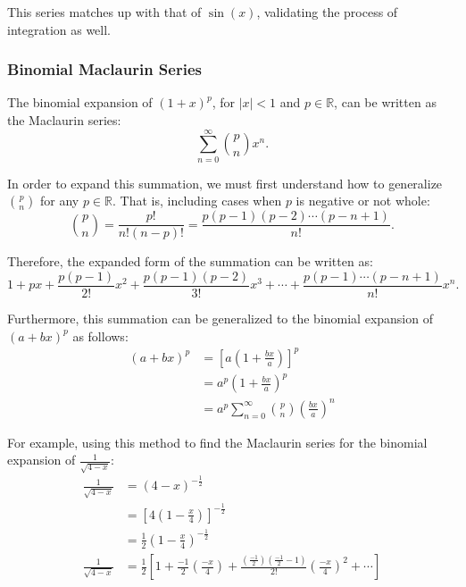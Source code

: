 \documentclass[12pt]{article}
\begin{document}
This series matches up with that of $\sin(x)$, validating the process of integration as well.

\subsubsection{Binomial Maclaurin Series}

\noindent The binomial expansion of $(1 + x)^p$, for $|x| < 1$ and $p \in \mathbb{R}$, can be written as the Maclaurin series:
\[ \sum_{n=0}^\infty \binom{p}{n} x^n. \]

In order to expand this summation, we must first understand how to generalize $\binom{p}{n}$ for any $p \in \mathbb{R}$. That is, including cases when $p$ is negative or not whole:
\[ \binom{p}{n} = \frac{p!}{n!(n-p)!} = \frac{p(p-1)(p-2) \cdots (p-n+1)}{n!}. \]

\noindent Therefore, the expanded form of the summation can be written as:
\[ 1 + px + \frac{p(p-1)}{2!} x^2 + \frac{p(p-1)(p-2)}{3!} x^3 + \cdots + \frac{p(p-1) \cdots (p-n+1)}{n!} x^n. \]

Furthermore, this summation can be generalized to the binomial expansion of ${(a + bx)^p}$ as follows:
\begin{align*}
	(a + bx)^p & = \left[ a \left( 1 + \frac{bx}{a} \right) \right]^p                 \\[6pt]
	& = a^p \left( 1 + \frac{bx}{a} \right)^p                              \\[6pt]
	& = a^p \sum_{n=0}^{\infty} \binom{p}{n} \left( \frac{bx}{a} \right)^n
\end{align*}

For example, using this method to find the Maclaurin series for the binomial expansion of $\frac{1}{\sqrt{4 - x}}$:
\begin{align*}
	\frac{1}{\sqrt{4 - x}} & = (4 - x)^{-\frac{1}{2}}                                                                                                                                                                  \\[6pt]
	& = \left[ 4 \left( 1 - \frac{x}{4} \right) \right]^{-\frac{1}{2}}                                                                                                                          \\[6pt]
	& = \frac{1}{2} \left( 1 - \frac{x}{4} \right)^{-\frac{1}{2}}                                                                                                                               \\[6pt]
	\frac{1}{\sqrt{4 - x}} & = \frac{1}{2} \left[ 1 + \frac{-1}{2} \left( \frac{-x}{4} \right) + \frac{\left( \frac{-1}{2} \right) \left( \frac{-1}{2} - 1 \right)}{2!} \left( \frac{-x}{4} \right)^2 + \cdots \right]
\end{align*}
\end{document}
